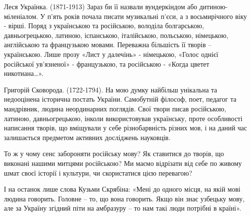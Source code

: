 Леся Українка. (1871-1913) Зараз би її назвали вундеркіндом або
дитиною-міленіалом. У п’ять років почала писати музикальні п’єси, а з
восьмирічного віку - вірші. Поряд з українською та російською, володіла
болгарською, давньогрецькою, латиною, іспанською, італійською, польською,
німецькою, англійською та французькою мовами. Переважна більшість її творів –
українською. Лише прозу «Лист у далечінь» - німецькою, «Голос однієї російської
ув’язненої» - французькою, та російською - «Когда цветет никотиана…».

Григорій Сковорода. (1722-1794). На мою думку найбільш унікальна та недооцінена
історична постать України. Самобутній філософ, поет, педагог та мандрівник,
людина неординарних поглядів. Свої твори писав російською, латиною,
давньогрецькою, інколи використовував українську, проте особливості написання
творів, що вміщували у себе різнобарвність різних мов, і на даний час
залишається предметом активних досліджень науковців.

То ж у чому сенс забороняти російську мову? Як ставитися до творів, що виконані
нашими митцями російською? Ми маємо відрізати від себе по живому шмат своєї
історії і культури, чи скористатися цією перевагою?

І на останок лише слова Кузьми Скрябіна: «Мені до одного місця, на якій мові
людина говорить. Головне – то, що вона говорить. Якщо він знає узбецьку мову,
але за Україну згідний піти на амбразуру – то нам такі люди потрібні в країні».
